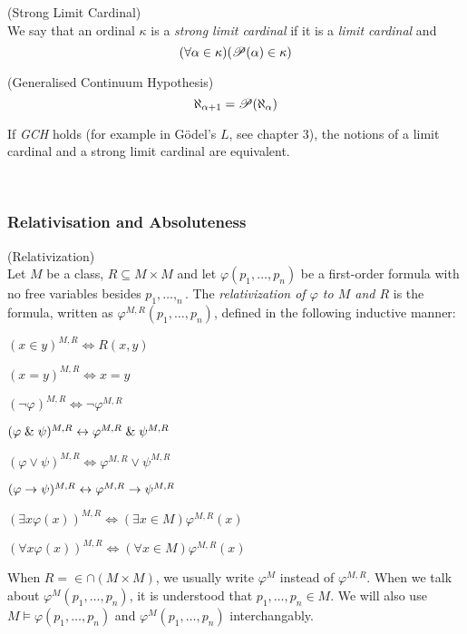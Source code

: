 \begin{definition}{(Strong Limit Cardinal)}\label{def:strong_limit_cardinal}\\
We say that an ordinal $\kappa$ is a \emph{strong limit cardinal} if it is a \emph{limit cardinal} and 
\begin{equation}
(\forall \alpha \in \kappa)(\mathscr{P} (\alpha) \in \kappa)
\end{equation}
\end{definition}

\begin{definition}{(Generalised Continuum Hypothesis)}\label{def:gch}\\
\begin{equation}
\aleph_{\alpha+1}=\mathscr{P} (\aleph_\alpha)
\end{equation}
\end{definition}
If \emph{GCH} holds (for example in Gödel's $L$, see chapter 3), the notions of a limit cardinal and a strong limit cardinal are equivalent.

\

\subsubsection{Relativisation and Absoluteness}
\begin{definition}{(Relativization)}\label{def:relativization}\\
Let $M$ be a class, $R \subseteq M\times M$ and let $\varphi(p_1, \ldots, p_n)$ be a first-order formula with no free variables besides $p_1, \ldots, _n$. 
The \emph{relativization of $\varphi$ to $M$ and $R$} is the formula, written as $\varphi^{M, R}(p_1, \ldots, p_n)$, defined in the following inductive manner:
\bce[(i)]
\item $(x \in y)^{M,R} \iff R(x, y)$
\item $(x = y)^{M,R} \iff x = y$
\item $(\neg \varphi)^{M,R} \iff \neg \varphi^{M,R}$
\item $(\varphi \mathrel{\&} \psi)^{M,R} \leftrightarrow \varphi^{M,R} \mathrel{\&} \psi^{M,R}$
\item $(\varphi \lor \psi)^{M,R} \iff \varphi^{M,R} \lor \psi^{M,R}$
\item $(\varphi \rightarrow \psi)^{M,R} \leftrightarrow \varphi^{M,R} \rightarrow \psi^{M,R}$
\item $(\exists x \varphi(x))^{M,R} \iff (\exists x \in M) \varphi^{M,R}(x)$
\item $(\forall x \varphi(x))^{M,R} \iff (\forall x \in M) \varphi^{M,R}(x)$
\ece
\end{definition}
When $R=\in\cap(M \times M)$, we usually write $\varphi^M$ instead of $\varphi^{M, R}$. When we talk about $\varphi^M(p_1, \ldots, p_n)$, it is understood that $p_1, \ldots, p_n \in M$.
We will also use $M \models \varphi(p_1, \ldots, p_n)$ and $\varphi^M(p_1, \ldots, p_n)$ interchangably.

